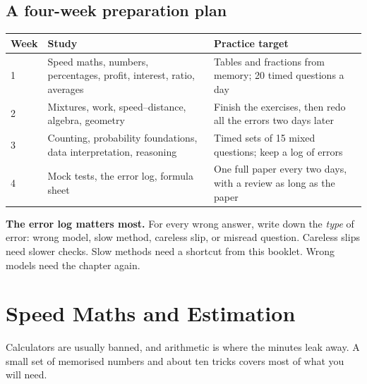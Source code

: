 \documentclass[11pt,a4paper,openany]{report}
\begin{document}
\section{A four-week preparation plan}
\begin{center}\small
\begin{tabular}{>{\raggedright}p{1.6cm}>{\raggedright}p{7.2cm}>{\raggedright\arraybackslash}p{5.4cm}}
\toprule
Week & Study & Practice target\\\midrule
1 & Speed maths, numbers, percentages, profit, interest, ratio, averages & Tables and fractions from memory; 20 timed questions a day\\
2 & Mixtures, work, speed--distance, algebra, geometry & Finish the exercises, then redo all the errors two days later\\
3 & Counting, probability foundations, data interpretation, reasoning & Timed sets of 15 mixed questions; keep a log of errors\\
4 & Mock tests, the error log, formula sheet & One full paper every two days, with a review as long as the paper\\
\bottomrule
\end{tabular}
\end{center}
\textbf{The error log matters most.} For every wrong answer, write down the \emph{type} of error: wrong model, slow method, careless slip, or misread question. Careless slips need slower checks. Slow methods need a shortcut from this booklet. Wrong models need the chapter again.

\chapter{Speed Maths and Estimation}\label{ch:speed}

Calculators are usually banned, and arithmetic is where the minutes leak away. A small set of memorised numbers and about ten tricks covers most of what you will need.
\end{document}
